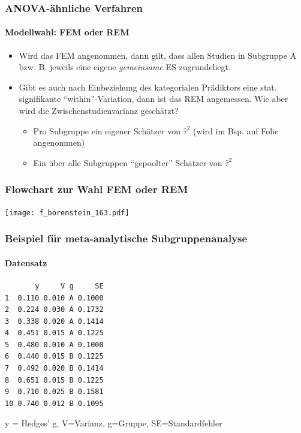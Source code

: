 \begin{frame}\frametitle{ANOVA-ähnliche Verfahren}\framesubtitle{Modellwahl: FEM oder REM}
  \begin{itemize}
  \item Wird das FEM angenommen, dann gilt, dass allen Studien in Subgruppe A
    bzw. B. jeweils eine eigene \emph{gemeinsame} ES zugrundeliegt.
  \item Gibt es auch nach Einbeziehung des kategorialen Prädiktors eine
    stat. signifikante \enquote{within}-Variation, dann ist das REM
    angemessen. Wie aber wird die Zwischenstudienvarianz geschätzt?
    \begin{itemize}
    \item Pro Subgruppe ein eigener Schätzer von $\widehat{\tau}^2$ (wird im
      Bsp. auf Folie \pageref{slide:anova-example} angenommen)
    \item Ein über alle Subgruppen \enquote{gepoolter} Schätzer von $\widehat{\tau}^2$
    \end{itemize}
  \end{itemize}
\end{frame}


\begin{frame}\frametitle{Flowchart zur Wahl FEM oder REM}
  \begin{center}
    \texttt{[image: f\_borenstein\_163.pdf]}
  \end{center}
  \citep[Quelle:][163]{borenstein_introduction_2009}
\end{frame}


\begin{frame}[fragile]
  \frametitle{Beispiel für meta-analytische Subgruppenanalyse}
  \framesubtitle{Datensatz}

\begin{knitrout}
\color{fgcolor}\begin{kframe}
\begin{verbatim}
       y     V g     SE
1  0.110 0.010 A 0.1000
2  0.224 0.030 A 0.1732
3  0.338 0.020 A 0.1414
4  0.451 0.015 A 0.1225
5  0.480 0.010 A 0.1000
6  0.440 0.015 B 0.1225
7  0.492 0.020 B 0.1414
8  0.651 0.015 B 0.1225
9  0.710 0.025 B 0.1581
10 0.740 0.012 B 0.1095
\end{verbatim}
\end{kframe}
\end{knitrout}

y = Hedges' g, V=Varianz, g=Gruppe, SE=Standardfehler\\
\citep[Quelle: ][152]{borenstein_introduction_2009}

\end{frame}


